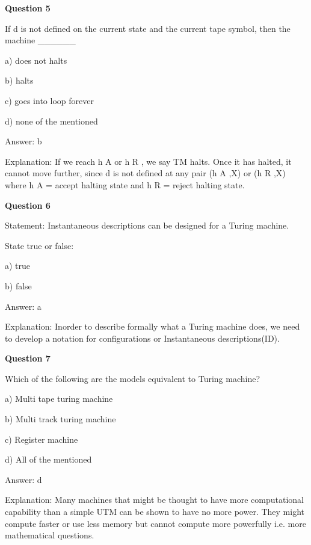 \documentclass{article}
\begin{document}
\begin{mdframed}[linewidth=1pt, roundcorner=5pt, linecolor=gray!30, backgroundcolor=gray!5]
\textbf{Question 5} 

If  d is not defined on the current state and the current tape symbol, then the machine \_\_\_\_\_\_

a) does not halts

b) halts

c) goes into loop forever

d) none of the mentioned
\vspace{5pt} \par
\begin{tcolorbox}[colback=green!5, colframe=green!40!black, title=Solution]
Answer: b

Explanation: If we reach h
A
 or h
R
, we say TM halts. Once it has halted, it cannot move further, since  d is not defined at any pair (h
A
,X) or (h
R
,X) where h
A
 = accept halting state and h
R
 = reject halting state.
\end{tcolorbox}
\end{mdframed}

\begin{mdframed}[linewidth=1pt, roundcorner=5pt, linecolor=gray!30, backgroundcolor=gray!5]
\textbf{Question 6} 

Statement: Instantaneous descriptions can be designed for a Turing machine.

State true or false:

a) true

b) false
\vspace{5pt} \par
\begin{tcolorbox}[colback=green!5, colframe=green!40!black, title=Solution]
Answer: a

Explanation: Inorder to describe formally what a Turing machine does, we need to develop a notation for configurations or Instantaneous descriptions(ID).
\end{tcolorbox}
\end{mdframed}
\newpage

\begin{mdframed}[linewidth=1pt, roundcorner=5pt, linecolor=gray!30, backgroundcolor=gray!5]
\textbf{Question 7} 

Which of the following are the models equivalent to Turing machine?

a) Multi tape turing machine

b) Multi track turing machine

c) Register machine

d) All of the mentioned
\vspace{5pt} \par
\begin{tcolorbox}[colback=green!5, colframe=green!40!black, title=Solution]
Answer: d

Explanation: Many machines that might be thought to have more computational capability than a simple UTM can be shown to have  no more power. They might compute faster or use less memory but cannot compute more powerfully i.e. more mathematical questions.
\end{tcolorbox}
\end{mdframed}
\end{document}
